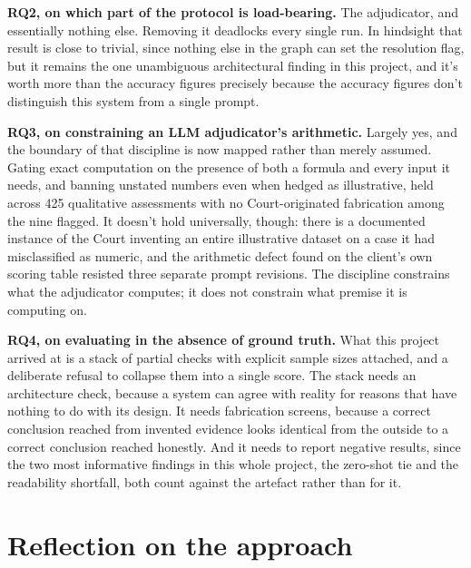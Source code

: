 \textbf{RQ2, on which part of the protocol is load-bearing.} The adjudicator,
and essentially nothing else. Removing it deadlocks every single run. In
hindsight that result is close to trivial, since nothing else in the graph can
set the resolution flag, but it remains the one unambiguous architectural
finding in this
project, and it's worth more than the accuracy figures precisely because the
accuracy figures don't distinguish this system from a single prompt.

\textbf{RQ3, on constraining an LLM adjudicator's arithmetic.} Largely yes, and
the boundary of that discipline is now mapped rather than merely assumed. Gating
exact computation on the presence of both a formula and every input it needs,
and banning unstated numbers even when hedged as illustrative, held across 425
qualitative assessments with no Court-originated fabrication among the nine
flagged. It doesn't hold universally, though: there is a documented instance of
the Court inventing an entire illustrative dataset on a case it had
misclassified as numeric, and the arithmetic defect found on the client's own
scoring table resisted three separate prompt revisions. The discipline
constrains what the adjudicator computes; it does not constrain what premise it
is computing on.

\textbf{RQ4, on evaluating in the absence of ground truth.} What this project
arrived at is a stack of partial checks with explicit sample sizes attached, and
a deliberate refusal to collapse them into a single score. The stack needs an
architecture check, because a system can agree with reality for reasons that
have nothing to do with its design. It needs fabrication screens, because a
correct conclusion reached from invented evidence looks identical from the
outside to a correct conclusion reached honestly. And it needs to report
negative results, since the two most informative findings in this whole
project, the zero-shot tie and the readability shortfall, both count against the
artefact rather than for it.

\section{Reflection on the approach}

